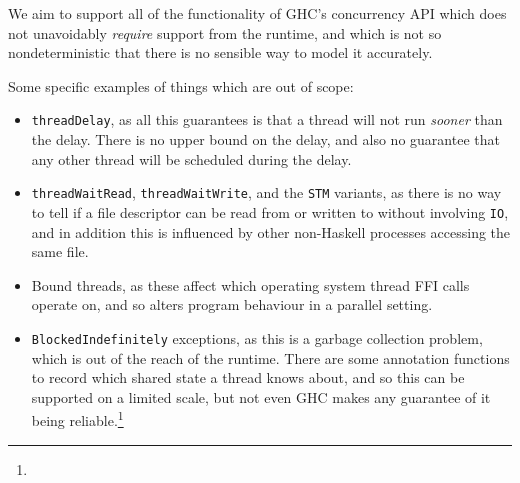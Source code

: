 We aim to support all of the functionality of GHC's concurrency API
which does not unavoidably \emph{require} support from the runtime,
and which is not so nondeterministic that there is no sensible way to
model it accurately.

Some specific examples of things which are out of scope:

\begin{itemize}
\item \verb|threadDelay|, as all this guarantees is that a thread will
  not run \textit{sooner} than the delay. There is no upper bound on
  the delay, and also no guarantee that any other thread will be
  scheduled during the delay.

\item \verb|threadWaitRead|, \verb|threadWaitWrite|, and the
  \verb|STM| variants, as there is no way to tell if a file descriptor
  can be read from or written to without involving \verb|IO|, and in
  addition this is influenced by other non-Haskell processes accessing
  the same file.

\item Bound threads, as these affect which operating system thread FFI
  calls operate on, and so alters program behaviour in a parallel
  setting.

\item \verb|BlockedIndefinitely| exceptions, as this is a garbage
  collection problem, which is out of the reach of the runtime. There
  are some annotation functions to record which shared state a thread
  knows about, and so this can be supported on a limited scale, but
  not even GHC makes any guarantee of it being reliable.\footnote{
    }
\end{itemize}
